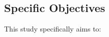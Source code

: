 \subsection{Specific Objectives}
\label{sec:specificobjectives}

%
%
This study specifically aims to:


\begin{comment}
How to formulate your research objectives:
1. Identify what research steps do you need to perform to achieve your general objective.
2. Identify the questions that must be answered for you to achieve your general objective.
    Thereafter, convert these questions into action statements

Example #1:

Research Question:
  What are the general features of a web-based learning environment?

Specific Objective:
   To review existing web-based learning environment that teaches language learning for children


Example #2:

Research Question:
   How will you represent commonsense knowledge for use by computer systems?

Specific Objective:
   To identify knowledge representation approaches used by existing story generation systems

Example #3:
Research Question:
   What types of storytelling knowledge are needed to generate stories?

Specific Objective:
    To identify the different types of storytelling knowledge used in generating stories

Example #4:
Research Question:
    What machine learning approaches will you utilize?

Specific Objective:
    To determine existing machine learning algorithms [that can be used in training the computer system to detect cyberbullying cases] 

Example #5: Research Question:
    How will your research output be evaluated?

Specific Objective:
    To define evaluation metrics for validating the accuracy of the translation

\end{comment}

